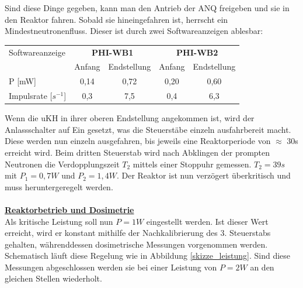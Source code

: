     Sind diese Dinge gegeben, kann man den Antrieb der ANQ freigeben und sie in den Reaktor fahren. Sobald sie hineingefahren ist, herrscht ein Mindestneutronenfluss. Dieser ist durch zwei Softwareanzeigen ablesbar: 
    \begin{center}
    \begin{tabular}{l|c|c|c|c}
             Softwareanzeige  & \multicolumn{2}{c|}{\textbf{PHI-WB1}} & \multicolumn{2}{c}{\textbf{PHI-WB2}}\\
                              & Anfang & Endstellung & Anfang & Endstellung \\ 
       \hline           P [mW]& 0,14   & 0,72        & 0,20   & 0,60        \\
         Impulsrate [$s^{-1}$]& 0,3    & 7,5         & 0,4    & 6,3         
    \end{tabular}
    \label{df:ANQein}
    \end{center}
    Wenn die uKH in ihrer oberen Endstellung angekommen ist, wird der Anlassschalter auf Ein gesetzt, was die Steuerstäbe einzeln ausfahrbereit macht. Diese werden nun einzeln ausgefahren, bis jeweils eine Reaktorperiode von $\approx$ 30\unit{s} erreicht wird.
    Beim dritten Steuerstab wird nach Abklingen der prompten Neutronen die Verdopplungszeit $T_2$ mittels einer Stoppuhr gemessen. $T_2 = 39\unit{s}$ mit $P_1 = 0,7\unit{W}$ und $P_2 = 1,4\unit{W}$. Der Reaktor ist nun verzögert überkritisch und muss heruntergeregelt werden.\\ \ \\
    \underline{\textbf{Reaktorbetrieb und Dosimetrie}}\\
    Als kritische Leistung soll nun $P=1\unit{W}$ eingestellt werden. Ist dieser Wert erreicht, wird er konstant mithilfe der Nachkalibrierung des 3. Steuerstabs gehalten, währenddessen dosimetrische Messungen vorgenommen werden. Schematisch läuft diese Regelung wie in Abbildung \ref{skizze_leistung}.
     Sind diese Messungen abgeschlossen werden sie bei einer Leistung von $P = 2\unit{W}$ an den gleichen Stellen wiederholt.
